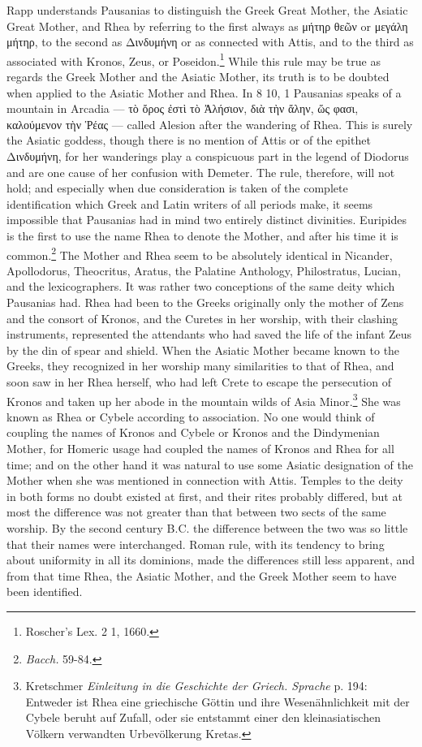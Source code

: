 \documentclass[a4paper, 11pt, oneside, polutonikogreek, english]{article}
\begin{document}
Rapp understands Pausanias to distinguish the Greek Great Mother, the Asiatic Great Mother, and Rhea by referring to the first always as μήτηρ θεῶν or μεγάλη μήτηρ, to the second as Δινδυμήνη or as connected with Attis, and to the third as associated with Kronos, Zeus, or Poseidon.\footnote{Roscher's Lex. 2 1, 1660.} While this rule may be true as regards the Greek Mother and the Asiatic Mother, its truth is to be doubted when applied to the Asiatic Mother and Rhea. In 8 10, 1 Pausanias speaks of a mountain in Arcadia --- τὸ ὄρος ἐστὶ τὸ Ἀλήσιον, διὰ τὴν ἄλην, ὥς φασι, καλούμενον τὴν Ῥέας --- called Alesion after the wandering of Rhea. This is surely the Asiatic goddess, though there is no mention of Attis or of the epithet Δινδυμήνη, for her wanderings play a conspicuous part in the legend of Diodorus and are one cause of her confusion with Demeter. The rule, therefore, will not hold; and especially when due consideration is taken of the complete identification which Greek and Latin writers of all periods make, it seems impossible that Pausanias had in mind two entirely distinct divinities. Euripides is the first to use the name Rhea to denote the Mother, and after his time it is common.\footnote{\emph{Bacch.} 59-84.} The Mother and Rhea seem to be absolutely identical in Nicander, Apollodorus, Theocritus, Aratus, the Palatine Anthology, Philostratus, Lucian, and the lexicographers. It was rather two conceptions of the same deity which Pausanias had. Rhea had been to the Greeks originally only the mother of Zens and the consort of Kronos, and the Curetes in her worship, with their clashing instruments, represented the attendants who had saved the life of the infant Zeus by the din of spear and shield. When the Asiatic Mother became known to the Greeks, they recognized in her worship many similarities to that of Rhea, and soon saw in her Rhea herself, who had left Crete to escape the persecution of Kronos and taken up her abode in the mountain wilds of Asia Minor.\footnote{Kretschmer \emph{Einleitung in die Geschichte der Griech. Sprache} p. 194: Entweder ist Rhea eine griechische Göttin und ihre Wesenähnlichkeit mit der Cybele beruht auf Zufall, oder sie entstammt einer den kleinasiatischen Völkern verwandten Urbevölkerung Kretas.} She was known as Rhea or Cybele according to association. No one would think of coupling the names of Kronos and Cybele or Kronos and the Dindymenian Mother, for Homeric usage had coupled the names of Kronos and Rhea for all time; and on the other hand it was natural to use some Asiatic designation of the Mother when she was mentioned in connection with Attis. Temples to the deity in both forms no doubt existed at first, and their rites probably differed, but at most the difference was not greater than that between two sects of the same worship. By the second century \textsc{B.C.} the difference between the two was so little that their names were interchanged. Roman rule, with its tendency to bring about uniformity in all its dominions, made the differences still less apparent, and from that time Rhea, the Asiatic Mother, and the Greek Mother seem to have been identified.
\clearpage
\end{document}

